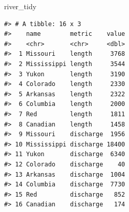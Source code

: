 \documentclass[
]{book}
\newenvironment{Shaded}{\begin{snugshade}}{\end{snugshade}}
\newcommand{\NormalTok}[1]{#1}
\begin{document}
\begin{Shaded}
\begin{Highlighting}[]
\NormalTok{river_tidy}
\end{Highlighting}
\end{Shaded}

\begin{verbatim}
#> # A tibble: 16 x 3
#>    name        metric    value
#>    <chr>       <chr>     <dbl>
#>  1 Missouri    length     3768
#>  2 Mississippi length     3544
#>  3 Yukon       length     3190
#>  4 Colorado    length     2330
#>  5 Arkansas    length     2322
#>  6 Columbia    length     2000
#>  7 Red         length     1811
#>  8 Canadian    length     1458
#>  9 Missouri    discharge  1956
#> 10 Mississippi discharge 18400
#> 11 Yukon       discharge  6340
#> 12 Colorado    discharge    40
#> 13 Arkansas    discharge  1004
#> 14 Columbia    discharge  7730
#> 15 Red         discharge   852
#> 16 Canadian    discharge   174
\end{verbatim}

  
\end{document}
